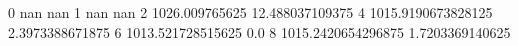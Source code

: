 0 nan nan
1 nan nan
2 1026.009765625 12.488037109375
4 1015.9190673828125 2.3973388671875
6 1013.521728515625 0.0
8 1015.2420654296875 1.7203369140625
